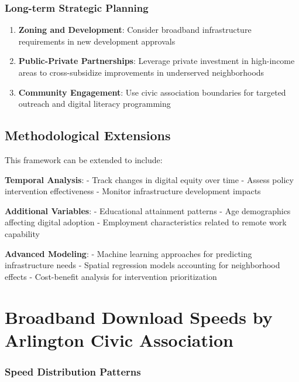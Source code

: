 \documentclass[
  letterpaper,
  DIV=11,
  numbers=noendperiod]{scrartcl}
\providecommand{\tightlist}{%
  \setlength{\itemsep}{0pt}\setlength{\parskip}{0pt}}
\begin{document}
\subsubsection{Long-term Strategic
Planning}\label{long-term-strategic-planning}

\begin{enumerate}
\def\labelenumi{\arabic{enumi}.}
\tightlist
\item
  \textbf{Zoning and Development}: Consider broadband infrastructure
  requirements in new development approvals
\item
  \textbf{Public-Private Partnerships}: Leverage private investment in
  high-income areas to cross-subsidize improvements in underserved
  neighborhoods
\item
  \textbf{Community Engagement}: Use civic association boundaries for
  targeted outreach and digital literacy programming
\end{enumerate}

\subsection{Methodological Extensions}\label{methodological-extensions}

This framework can be extended to include:

\textbf{Temporal Analysis}: - Track changes in digital equity over time
- Assess policy intervention effectiveness - Monitor infrastructure
development impacts

\textbf{Additional Variables}: - Educational attainment patterns - Age
demographics affecting digital adoption - Employment characteristics
related to remote work capability

\textbf{Advanced Modeling}: - Machine learning approaches for predicting
infrastructure needs - Spatial regression models accounting for
neighborhood effects - Cost-benefit analysis for intervention
prioritization

\section{Broadband Download Speeds by Arlington Civic
Association}\label{broadband-download-speeds-by-arlington-civic-association}

\subsubsection{Speed Distribution
Patterns}\label{speed-distribution-patterns}
\end{document}
